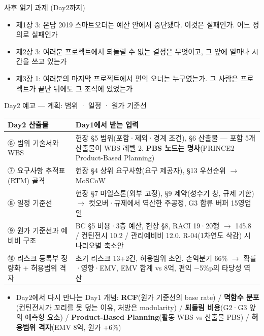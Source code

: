 \begin{frame}[allowframebreaks=1.0]{사후 읽기 과제 (Day2까지)}
\begin{itemize}
\item\relax 제1장 3: 온담 2019 스마트오더는 예산 안에서 중단됐다. 이것은 실패인가. 어느 정의로 실패인가
\item\relax 제2장 3: 여러분 프로젝트에서 되돌릴 수 없는 결정은 무엇이고, 그 앞에 얼마나 시간을 쓰고 있는가
\item\relax 제3장 1: 여러분의 마지막 프로젝트에서 편익 오너는 누구였는가. 그 사람은 프로젝트가 끝난 뒤에도 그 조직에 있었는가
\end{itemize}
\end{frame}

\begin{frame}[allowframebreaks=1.0]{Day2 예고 — 계획: 범위 · 일정 · 원가 기준선}
\small
{\footnotesize\setlength{\tabcolsep}{3pt}\renewcommand{\arraystretch}{1.12}
\begin{tabular}{@{}>{\raggedright\arraybackslash}p{}>{\raggedright\arraybackslash}p{}@{}}
\toprule
\textbf{Day2 산출물} & \textbf{Day1에서 받는 입력} \\
\midrule
⑥ 범위 기술서와 WBS & 헌장 §5 범위(포함·제외·경계 조건), §6 산출물 — 포함 5개 산출물이 WBS 레벨 2. \textbf{PBS 노드는 명사}(PRINCE2 Product-Based Planning) \\
⑦ 요구사항 추적표(RTM) 골격 & 헌장 §4 상위 요구사항(요구 제공자), §13 우선순위 $\rightarrow$ MoSCoW \\
⑧ 일정 기준선 & 헌장 §7 마일스톤(외부 고정), §9 제약(성수기 창, 규제 기한) $\rightarrow$ 컷오버·규제에서 역산한 주공정, G3 합류 버퍼 15영업일 \\
⑨ 원가 기준선과 예비비 구조 & BC §5 비용·3층 예산, 헌장 §8, RACI 19·20행 $\rightarrow$ 145.8 / 컨틴전시 10.2 / 관리예비비 12.0. R-04(1차연도 삭감) 시나리오별 축소안 \\
⑩ 리스크 등록부 정량화 + 허용범위 격자 & 초기 리스크 13+2건, 허용범위 초안, 손익분기 66\% $\rightarrow$ 확률·영향·EMV, EMV 합계 vs 8억, 편익 $-$5\%p의 타당성 역산 \\
\bottomrule
\end{tabular}}
\par\smallskip
\begin{itemize}
\item\relax Day2에서 다시 만나는 Day1 개념: \textbf{RCF}(원가 기준선의 base rate) / \textbf{멱함수 분포}(컨틴전시가 꼬리를 못 덮는 이유, 처방은 modularity) / \textbf{되돌림 비용}(G2·G3 앞의 예측형 요소) / \textbf{Product-Based Planning}(활동 WBS vs 산출물 PBS) / \textbf{허용범위 격자}(EMV 8억, 원가 +6\%)

\end{itemize}
\end{frame}
